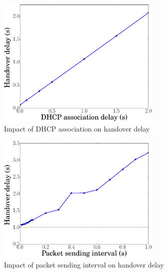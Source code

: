\begin{figure}[!th]
	\centering
	\includegraphics[width=0.7\textwidth]{Pics/LISP_mobility_xTR_DHCP}
	\caption{Impact of DHCP association on handover delay}
	\label{LISP_mobility_xTR_DHCP}
\end{figure}


\begin{figure}[!th]
	\centering
	\includegraphics[width=0.7\textwidth]{Pics/LISP_mobility_xTR_PacketInterval}
	\caption{Impact of packet sending interval on handover delay}
	\label{LISP_mobility_xTR_PacketInterval}
\end{figure}

